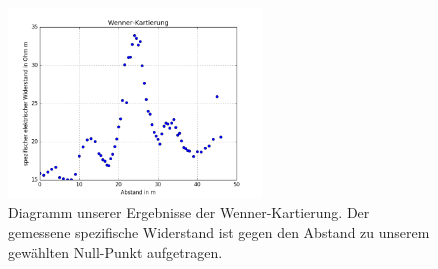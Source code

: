 \begin{figure}[h]
\centering
\includegraphics[width=0.6\textwidth]{wennerkartierung.png}
\caption{Diagramm unserer Ergebnisse der Wenner-Kartierung. Der gemessene spezifische Widerstand ist gegen den Abstand zu unserem gewählten Null-Punkt aufgetragen.}
\label{abb:Wenner}
\end{figure}



